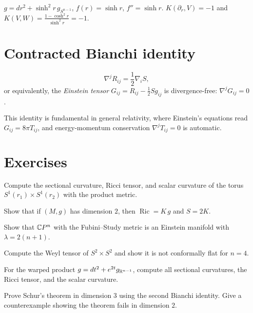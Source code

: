 \begin{example}
$g = dr^2 + \sinh^2\!r\, g_{S^{n-1}}$, $f(r) = \sinh r$, $f'' = \sinh r$.
$K(\partial_r, V) = -1$ and $K(V,W) = \frac{1 - \cosh^2 r}{\sinh^2 r} = -1$.
\end{example}

\section{Contracted Bianchi identity}

\begin{theorem}
\[
    \nabla^j R_{ij} = \frac{1}{2}\nabla_i S,
\]
or equivalently, the \emph{Einstein tensor}
$G_{ij} = R_{ij} - \frac{1}{2}Sg_{ij}$ is divergence-free:
$\nabla^j G_{ij} = 0$.
\end{theorem}

\begin{remark}
This identity is fundamental in general relativity, where Einstein's equations
read $G_{ij} = 8\pi T_{ij}$, and energy-momentum conservation
$\nabla^j T_{ij} = 0$ is automatic.
\end{remark}

\section{Exercises}

\begin{exercise}
Compute the sectional curvature, Ricci tensor, and scalar curvature of the torus
$S^1(r_1) \times S^1(r_2)$ with the product metric.
\end{exercise}

\begin{exercise}
Show that if $(M, g)$ has dimension $2$, then $\operatorname{Ric} = K\, g$ and $S = 2K$.
\end{exercise}

\begin{exercise}
Show that $\mathbb{C} P^n$ with the Fubini--Study metric is an Einstein manifold with
$\lambda = 2(n+1)$.
\end{exercise}

\begin{exercise}
Compute the Weyl tensor of $S^2 \times S^2$ and show it is not conformally flat
for $n = 4$.
\end{exercise}

\begin{exercise}
For the warped product $g = dt^2 + e^{2t} g_{\mathbb{R}^{n-1}}$, compute all sectional
curvatures, the Ricci tensor, and the scalar curvature.
\end{exercise}

\begin{exercise}
Prove Schur's theorem in dimension $3$ using the second Bianchi identity. Give
a counterexample showing the theorem fails in dimension $2$.
\end{exercise}
